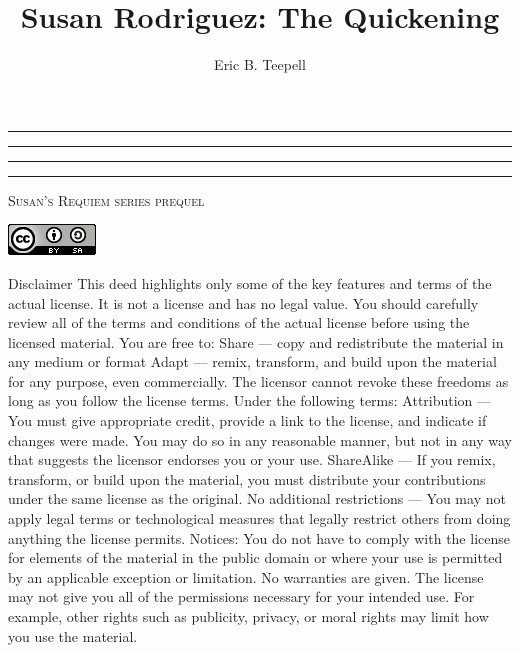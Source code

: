 \documentclass[12pt,twoside,onecolumn,openright,extrafontsizes]{memoir}
\title{Susan Rodriguez: The Quickening}
\author{Eric B. Teepell}
\newcommand{\press}{Susan's Requiem series prequel}
\newcommand*\halftitlepage{\begingroup %
  \setlength\drop{0.1\textheight}
  \begin{center}
  \vspace*{\drop}
  \rule{\textwidth}{0in}\par
  {\Large\textsc\thetitle\par}
  \rule{\textwidth}{0in}\par
  \vfill
  \end{center}
\endgroup}
\newlength\drop
\newcommand*\titleM{\begingroup %
  \setlength\drop{0.15\textheight}
  \begin{center}
  \vspace*{\drop}
  \rule{\textwidth}{0in}\par
  {\HUGE\textsc\thetitle\par}
  \rule{\textwidth}{0in}\par
  {\Large\textit\theauthor\par}
  \vfill
  {\Large\scshape\press}
  \end{center}
\endgroup}
\begin{document}
\pagestyle{empty}
\halftitlepage
\cleardoublepage
\titleM
\clearpage

\begin{center}
 	\centering
	\includegraphics[width=0.25\linewidth=0.25]{license}
\end{center}

\newpage
{\tiny Disclaimer This deed highlights only some of the key features and terms of the actual license. It is not a license and has no legal value. You should carefully review all of the terms and conditions of the actual license before using the licensed material. You are free to: Share — copy and redistribute the material in any medium or format Adapt — remix, transform, and build upon the material
for any purpose, even commercially. The licensor cannot revoke these freedoms as long as you follow the license terms. Under the following terms: Attribution — You must give appropriate credit, provide a link to the license, and indicate if changes were made. You may do so in any reasonable manner, but not in any way that suggests the licensor endorses you or your use. ShareAlike — If you remix, transform, or build upon the material, you must distribute your contributions under the same license as the original. No additional restrictions — You may not apply legal terms or technological measures that legally restrict others from doing anything the license permits. Notices: You do not have to comply with the license for elements of the material in the public domain or where your use is permitted by an applicable exception or limitation. No warranties are given. The license may not give you all of the permissions necessary for your intended use. For example, other rights such as publicity, privacy, or moral rights may limit how you use the material.
}
\clearpage
\end{document}
